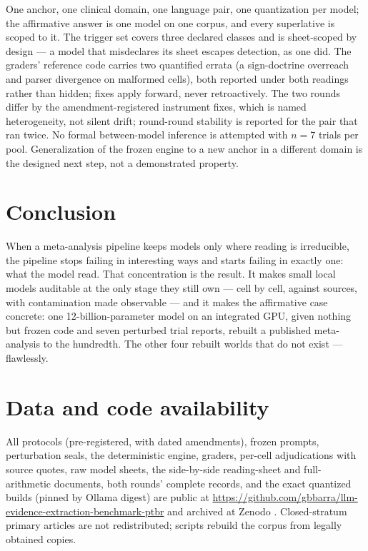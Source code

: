 \documentclass[11pt]{article}
\begin{document}
One anchor, one clinical domain, one language pair, one quantization per model; the affirmative answer is one model on one corpus, and every superlative is scoped to it. The trigger set covers three declared classes and is sheet-scoped by design --- a model that misdeclares its sheet escapes detection, as one did. The graders' reference code carries two quantified errata (a sign-doctrine overreach and parser divergence on malformed cells), both reported under both readings rather than hidden; fixes apply forward, never retroactively. The two rounds differ by the amendment-registered instrument fixes, which is named heterogeneity, not silent drift; round-round stability is reported for the pair that ran twice. No formal between-model inference is attempted with $n{=}7$ trials per pool. Generalization of the frozen engine to a new anchor in a different domain is the designed next step, not a demonstrated property.

\section{Conclusion}

When a meta-analysis pipeline keeps models only where reading is irreducible, the pipeline stops failing in interesting ways and starts failing in exactly one: what the model read. That concentration is the result. It makes small local models auditable at the only stage they still own --- cell by cell, against sources, with contamination made observable --- and it makes the affirmative case concrete: one 12-billion-parameter model on an integrated GPU, given nothing but frozen code and seven perturbed trial reports, rebuilt a published meta-analysis to the hundredth. The other four rebuilt worlds that do not exist --- flawlessly.

\section*{Data and code availability}

All protocols (pre-registered, with dated amendments), frozen prompts, perturbation seals, the deterministic engine, graders, per-cell adjudications with source quotes, raw model sheets, the side-by-side reading-sheet and full-arithmetic documents, both rounds' complete records, and the exact quantized builds (pinned by Ollama digest) are public at \url{https://github.com/gbbarra/llm-evidence-extraction-benchmark-ptbr} and archived at Zenodo \citep{barra2026extrai}. Closed-stratum primary articles are not redistributed; scripts rebuild the corpus from legally obtained copies.
\end{document}
